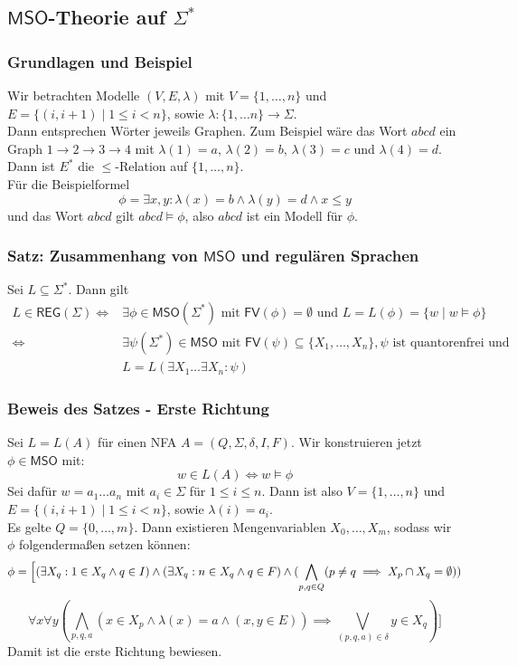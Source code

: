 \documentclass[12pt, german]{article}
\newcommand{\sigstern}{\Sigma^\ast}
\newcommand{\east}{E^{\ast}}
\newcommand{\fv}{\mathsf{FV}}
\newcommand{\mso}{\mathsf{MSO}}
\newcommand{\reg}{\mathsf{REG}}
\begin{document}
\subsection{$\mso$-Theorie auf $\sigstern$}

\subsubsection{Grundlagen und Beispiel}
	Wir betrachten Modelle $(V,E,\lambda)$ mit $V= \{1, \ldots, n\}$ und $E=\{(i, i+1) \mid 1 \leq i < n\}$, sowie $\lambda: \{1, \ldots n\} \to \Sigma$.\\


	Dann entsprechen Wörter jeweils Graphen.
	Zum Beispiel wäre das Wort $abcd$ ein Graph $ 1 \to 2 \to 3 \to 4$ mit $\lambda(1) = a$, $\lambda(2) = b$, $\lambda(3) = c$  und $\lambda(4) = d$. \\ 
	Dann ist $\east$ die $\leq$-Relation auf $\{1, \ldots, n\}$.\\
	Für die Beispielformel $$\phi = \exists x,y: \lambda(x) = b \land \lambda(y) = d \land x \leq y$$ und das Wort $abcd$ gilt $abcd \models \phi$, also $abcd$ ist ein Modell für $\phi$.

\subsubsection{Satz: Zusammenhang von $\mso$ und regulären Sprachen}
	Sei $L \subseteq \sigstern$. Dann gilt 
	\begin{align*}
	L \in \reg(\Sigma) \iff& \exists \phi \in \mso(\Sigma^\ast) \text{ mit } \fv(\phi) = \emptyset \text{ und } L=L(\phi) = \{w \mid w \models \phi \}\\
	\iff& \exists \psi(\Sigma^\ast) \in \mso  \text{ mit } \fv(\psi) \subseteq \{X_1, \ldots, X_n\}, \psi \text{ ist quantorenfrei und }\\ &L=L(\exists X_1 \ldots \exists X_n : \psi) 
	\end{align*}


\subsubsection{Beweis des Satzes - Erste Richtung}
	Sei $L= L(A)$ für einen NFA $A= (Q, \Sigma, \delta, I, F)$. Wir konstruieren jetzt $\phi \in \mso$ mit: $$w \in L(A) \iff w \models \phi$$
	Sei dafür $w = a_1 \ldots a_n$ mit $a_i \in \Sigma$ für $1\leq i \leq n$. Dann ist also $V = \{1, \ldots, n\}$ und $E=\{(i, i+1) \mid 1 \leq i <n\}$, sowie $\lambda(i) = a_i$.\\
	Es gelte $Q = \{0, \ldots, m\}$. Dann existieren Mengenvariablen $X_0, \ldots, X_m$, sodass wir $\phi$ folgenderma\ss en setzen können:
	$$\phi = \Bigl\lbrack(\exists X_q : 1 \in X_q \land q \in I) \land (\exists X_q : n \in X_q \land q \in F) \land  (\bigwedge_{p, q \in Q} (p \not = q \implies X_p \cap X_q = \emptyset))$$
	$$ \forall x \forall y ( \bigwedge_{p, q, a} (x \in X_p \land \lambda(x)= a \land (x,y \in E)) \implies  \bigvee_{(p,q,a) \in \delta} y \in X_q)\Bigr\rbrack$$
	Damit ist die erste Richtung bewiesen.
\end{document}
